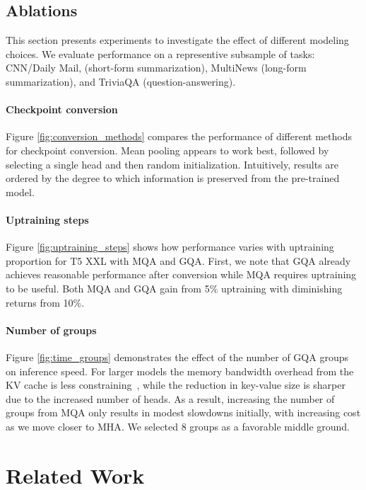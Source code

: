 \subsection{Ablations}

This section presents experiments to investigate the effect of different modeling choices. We evaluate performance on a representive subsample of tasks: CNN/Daily Mail, (short-form summarization), MultiNews (long-form summarization), and TriviaQA (question-answering).

\paragraph{Checkpoint conversion} Figure \ref{fig:conversion_methods} compares the performance of different methods for checkpoint conversion. Mean pooling appears to work best, followed by selecting a single head and then random initialization. Intuitively, results are ordered by the degree to which information is preserved from the pre-trained model.

\paragraph{Uptraining steps} Figure \ref{fig:uptraining_steps} shows how performance varies with uptraining proportion for T5 XXL with \textsc{MQA} and \textsc{GQA}. First, we note that \textsc{GQA} already achieves reasonable performance after conversion while \textsc{MQA} requires uptraining to be useful. Both \textsc{MQA} and \textsc{GQA} gain from 5\% uptraining with diminishing returns from 10\%.

\paragraph{Number of groups}

Figure \ref{fig:time_groups} demonstrates the effect of the number of \textsc{GQA} groups on inference speed. For larger models the memory bandwidth overhead from the KV cache is less constraining~\citep{shazeer2019mq}, while the reduction in key-value size is sharper due to the increased number of heads. As a result, increasing the number of groups from \textsc{MQA} only results in modest slowdowns initially, with increasing cost as we move closer to \textsc{MHA}. We selected 8 groups as a favorable middle ground.

\section{Related Work}

